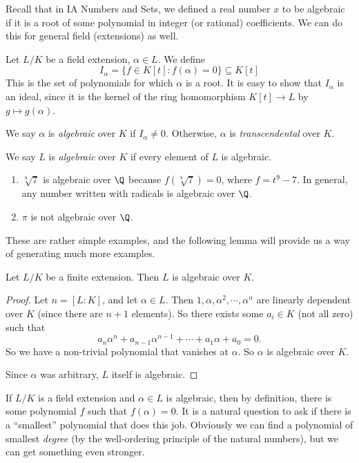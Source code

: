 \documentclass[a4paper]{article}
\begin{document}
Recall that in IA Numbers and Sets, we defined a real number $x$ to be algebraic if it is a root of some polynomial in integer (or rational) coefficients. We can do this for general field (extensions) as well.
\begin{defi}
  Let $L/K$ be a field extension, $\alpha\in L$. We define
  \[
    I_\alpha = \{f\in K[t] : f(\alpha) = 0\}\subseteq K[t]
  \]
  This is the set of polynomials for which $\alpha$ is a root. It is easy to show that $I_\alpha$ is an ideal, since it is the kernel of the ring homomorphism $K[t] \to L$ by $g \mapsto g(\alpha)$.

  We say $\alpha$ is \emph{algebraic} over $K$ if $I_\alpha \not= 0$. Otherwise, $\alpha$ is \emph{transcendental} over $K$.

  We say $L$ is \emph{algebraic} over $K$ if every element of $L$ is algebraic.
\end{defi}

\begin{eg}\leavevmode
  \begin{enumerate}
    \item $\sqrt[9]{7}$ is algebraic over $\Q$ because $f(\sqrt[9]{7}) = 0$, where $f = t^9 - 7$. In general, any number written with radicals is algebraic over $\Q$.
    \item $\pi$ is not algebraic over $\Q$.
  \end{enumerate}
\end{eg}
These are rather simple examples, and the following lemma will provide us a way of generating much more examples.

\begin{lemma}
  Let $L/K$ be a finite extension. Then $L$ is algebraic over $K$.
\end{lemma}

\begin{proof}
  Let $n = [L:K]$, and let $\alpha\in L$. Then $1, \alpha, \alpha^2, \cdots, \alpha^n$ are linearly dependent over $K$ (since there are $n + 1$ elements). So there exists some $a_i \in K$ (not all zero) such that
  \[
    a_n \alpha^n + a_{n - 1}\alpha^{n - 1} + \cdots + a_1 \alpha + a_0 = 0.
  \]
  So we have a non-trivial polynomial that vanishes at $\alpha$. So $\alpha$ is algebraic over $K$.

  Since $\alpha$ was arbitrary, $L$ itself is algebraic.
\end{proof}

If $L/K$ is a field extension and $\alpha \in L$ is algebraic, then by definition, there is some polynomial $f$ such that $f(\alpha) = 0$. It is a natural question to ask if there is a ``smallest'' polynomial that does this job. Obviously we can find a polynomial of smallest \emph{degree} (by the well-ordering principle of the natural numbers), but we can get something even stronger.
\end{document}
